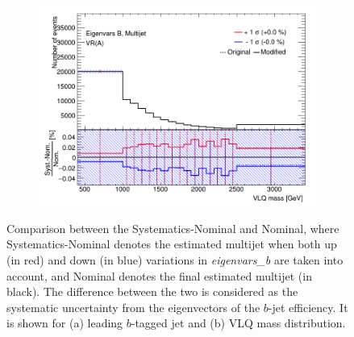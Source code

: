 \begin{itemize}
\begin{figure}[hbt!]
\begin{subfigure}{.35\textwidth}
			\includegraphics[width=\linewidth,height=\textheight,keepaspectratio]{VR_B_VLQM_Multijets.png}
			\caption{}
			\label{fig:uncertainties:systematics:btagging:b:vlqm}
		\end{subfigure}
		\caption{Comparison between the Systematics-Nominal and Nominal, where Systematics-Nominal denotes the estimated multijet when both up (in red) and down (in blue) variations in \textit{eigenvars\_b} are taken into account, and Nominal denotes the final estimated multijet (in black). The difference between the two is considered as the systematic uncertainty from the eigenvectors of the $b$-jet efficiency. It is shown for (a) leading $b$-tagged jet \pt and (b) VLQ mass distribution.}
		\label{fig:uncertainties:systematics:btagging:b}
	\end{figure}


\end{itemize}
